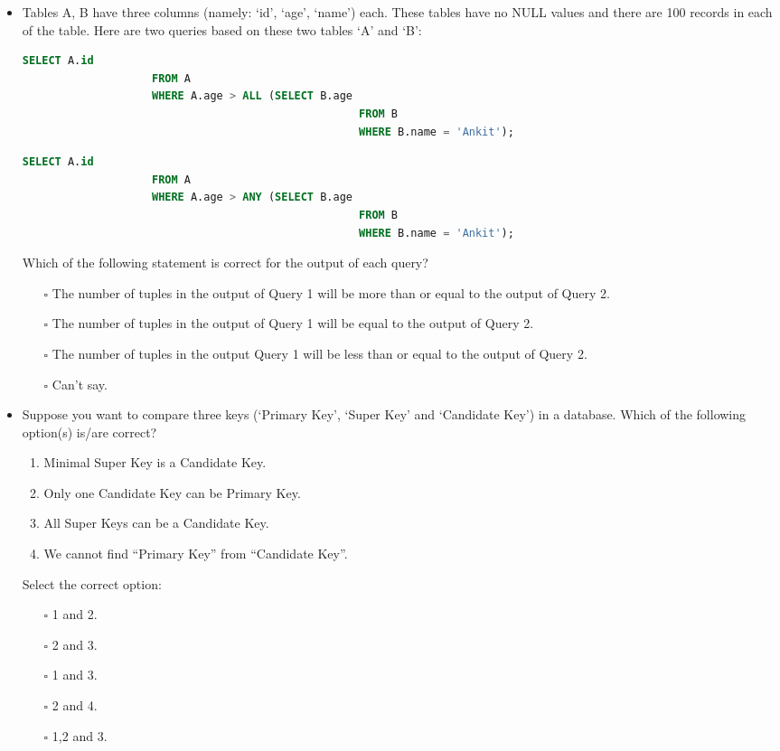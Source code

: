 \documentclass[10pt]{article}
\begin{document}
\begin{itemize}
			\item Tables A, B have three columns (namely: ‘id’, ‘age’, ‘name’) each. These tables have no NULL values and there are 100 records in each of the table. Here are two queries based on these two tables ‘A’ and ‘B’:
				\begin{lstlisting}[language=SQL,firstline=1, lastline=5] 
					SELECT A.id 
					FROM A 
					WHERE A.age > ALL (SELECT B.age 
													FROM B 
													WHERE B.name = 'Ankit');
				\end{lstlisting}
				\begin{lstlisting}[language=SQL,firstline=1, lastline=5] 
					SELECT A.id 
					FROM A 
					WHERE A.age > ANY (SELECT B.age 
													FROM B 
													WHERE B.name = 'Ankit');
				\end{lstlisting}
				Which of the following statement is correct for the output of each query?
				\begin{enumerate}
					\item[$\square$] The number of tuples in the output of Query 1 will be more than or equal to the output of Query 2.
					\item[$\square$] The number of tuples in the output of Query 1 will be equal to the output of Query 2.
					\item[$\square$] The number of tuples in the output Query 1 will be less than or equal to the output of Query 2.
					\item[$\square$] Can’t say.
				\end{enumerate}

			\item Suppose you want to compare three keys (‘Primary Key’, ‘Super Key’ and ‘Candidate Key’) in a database. Which of the following option(s) is/are correct?
				\begin{enumerate}
					\item Minimal Super Key is a Candidate Key.
					\item Only one Candidate Key can be Primary Key.
					\item All Super Keys can be a Candidate Key.
					\item We cannot find “Primary Key” from “Candidate Key”.
				\end{enumerate}
				Select the correct option:
				\begin{enumerate}
					\item[$\square$] 1 and 2.
					\item[$\square$] 2 and 3.
					\item[$\square$] 1 and 3.
					\item[$\square$] 2 and 4.
					\item[$\square$] 1,2 and 3.
				\end{enumerate}
			

\end{itemize}
\end{document}
